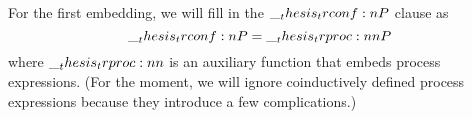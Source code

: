 
For the first embedding, we will fill in the $\__thesis_trconf:n {P}$ clause as
\begin{equation*}
  \trconf{P} = \trproc{P}
\end{equation*}
where $\trproc{}$ is an auxiliary function that embeds process expressions.
(For the moment, we will ignore coinductively defined process expressions because they introduce a few complications.)

